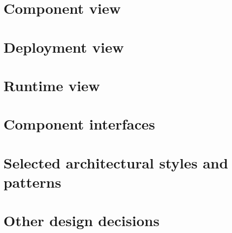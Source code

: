\section{Component view}

\section{Deployment view}

\section{Runtime view}

\section{Component interfaces}

\section{Selected architectural styles and patterns}

\section{Other design decisions}
